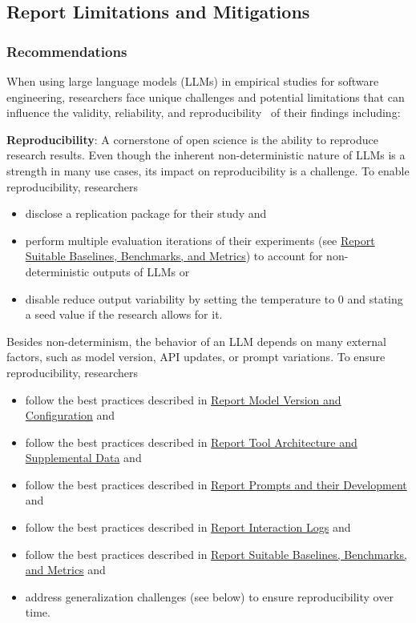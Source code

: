 



\subsection{Report Limitations and Mitigations}
\subsubsection{Recommendations}
When using large language models (LLMs) in empirical studies for software engineering, researchers face unique challenges and potential limitations that can influence the validity, reliability, and reproducibility~\cite{sallou2024breaking} of their findings including:

\textbf{Reproducibility}:
A cornerstone of open science is the ability to reproduce research results. Even though the inherent non-deterministic nature of LLMs is a strength in many use cases, its impact on reproducibility is a challenge. To enable reproducibility, researchers 
\begin{itemize}
  \item \must disclose a replication package for their study and
  \item \should perform multiple evaluation iterations of their experiments (see \href{/guidelines/report-baselines-benchmarks-and-metrics}{Report Suitable Baselines, Benchmarks, and Metrics}) to account for non-deterministic outputs of LLMs or
  \item \may disable reduce output variability by setting the temperature to 0 and stating a seed value if the research allows for it.
\end{itemize}
Besides non-determinism, the behavior of an LLM depends on many external factors, such as model version, API updates, or prompt variations. To ensure reproducibility, researchers
\begin{itemize}
  \item \should follow the best practices described in \href{/guidelines/report-version-and-configuration}{Report Model Version and Configuration} and
  \item \should follow the best practices described in \href{/guidelines/report-architecture-and-data}{Report Tool Architecture and Supplemental Data} and
  \item \should follow the best practices described in \href{/guidelines/report-prompts}{Report Prompts and their Development} and
  \item \should follow the best practices described in \href{/guidelines/report-interaction-logs}{Report Interaction Logs} and
  \item \should follow the best practices described in \href{/guidelines/report-baselines-benchmarks-and-metrics}{Report Suitable Baselines, Benchmarks, and Metrics} and
  \item \should address generalization challenges (see below) to ensure reproducibility over time.
\end{itemize}

